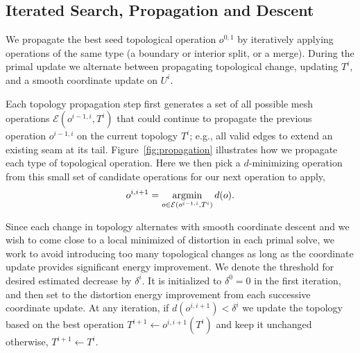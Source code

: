 \subsection{Iterated Search, Propagation and Descent}
\label{sec:topology_search}

We propagate the best seed topological operation $o^{0,1}$ by iteratively applying operations of the same type (a boundary or interior split, or a merge). During the primal update we alternate between propagating topological change, updating $T^i$, and a smooth coordinate update on $U^i$.



Each topology propagation step first generates a set of all possible mesh operations $\mathcal{E}(o^{i-1, i}, T^{i})$ that could continue to propagate the previous operation $o^{i-1, i}$ on the current topology $T^{i}$; e.g., all valid edges to extend an existing seam at its tail. Figure~\ref{fig:propagation} illustrates how we propagate each type of topological operation.
%
Here we then pick a $d$-minimizing operation from this small set of candidate operations for our next operation to apply,
\begin{align}
\label{eq:minE}
o^{i,i+1} = \operatorname*{argmin}_{o \in \mathcal{E}(o^{i-1, i}, T^i)} d(o).
\end{align}

Since each change in topology alternates with smooth coordinate descent and we wish to come close to a local minimized of distortion in each primal solve, we work to avoid introducing too many topological changes as long as the coordinate update provides significant energy improvement. We denote the threshold for desired estimated decrease by $\delta^{i}$. It is initialized to $\delta^0=0$ in the first iteration, and then set to the distortion energy improvement from each successive coordinate update. At any iteration, if $d(o^{i,i+1}) < \delta^{i}$ we update the topology based on the best operation $T^{i+1} \leftarrow o^{i, i+1}(T^{i})$ and keep it unchanged otherwise, $T^{i+1} \leftarrow T^i$.

